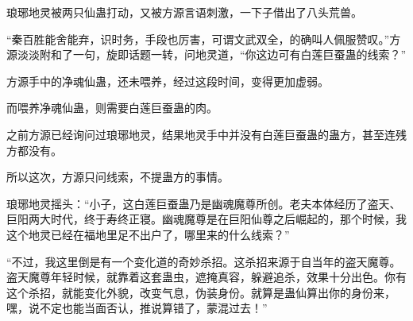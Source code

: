 \begin{this_body}
琅琊地灵被两只仙蛊打动，又被方源言语刺激，一下子借出了八头荒兽。

“秦百胜能舍能弃，识时务，手段也厉害，可谓文武双全，的确叫人佩服赞叹。”方源淡淡附和了一句，旋即话题一转，问地灵道，“你这边可有白莲巨蚕蛊的线索？”

方源手中的净魂仙蛊，还未喂养，经过这段时间，变得更加虚弱。

而喂养净魂仙蛊，则需要白莲巨蚕蛊的肉。

之前方源已经询问过琅琊地灵，结果地灵手中并没有白莲巨蚕蛊的蛊方，甚至连残方都没有。

所以这次，方源只问线索，不提蛊方的事情。

琅琊地灵摇头：“小子，这白莲巨蚕蛊乃是幽魂魔尊所创。老夫本体经历了盗天、巨阳两大时代，终于寿终正寝。幽魂魔尊是在巨阳仙尊之后崛起的，那个时候，我这个地灵已经在福地里足不出户了，哪里来的什么线索？”

“不过，我这里倒是有一个变化道的奇妙杀招。这杀招来源于自当年的盗天魔尊。盗天魔尊年轻时候，就靠着这套蛊虫，遮掩真容，躲避追杀，效果十分出色。你有这个杀招，就能变化外貌，改变气息，伪装身份。就算是蛊仙算出你的身份来，嘿，说不定也能当面否认，推说算错了，蒙混过去！”

\end{this_body}

